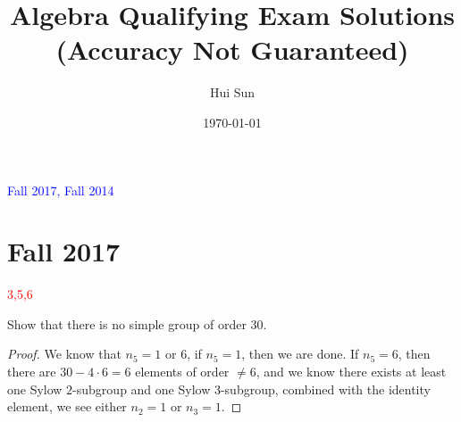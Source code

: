 \documentclass[openany]{book}
\title{Algebra Qualifying Exam Solutions
\\ 
\vspace{0.4cm}
\Large (Accuracy Not Guaranteed)}
\date{\today}
\author{Hui Sun}
\begin{document}
\maketitle

\tableofcontents
\newpage

\textcolor{blue}{Fall 2017, Fall 2014}

\chapter{Fall 2017}



\textcolor{red}{3,5,6}

\begin{prob}
    Show that there is no simple group of order 30.
\end{prob}
\begin{proof}
    We know that $n_5=1$ or $6$, if $n_5=1$, then we are done. If $n_5=6$, then there are $30-4\cdot 6=6$ elements of order $\neq 6$, and we know there exists at least one Sylow $2$-subgroup and one Sylow $3$-subgroup, combined with the identity element, we see either $n_2=1$ or $n_3=1$. 
\end{proof}
\end{document}
